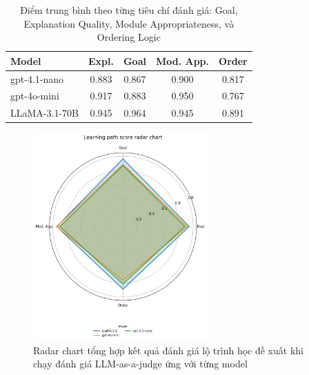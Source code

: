 \begin{table}[h!]
\centering
\begin{tabular}{lcccc}
\toprule
\textbf{Model} & \textbf{Expl.} & \textbf{Goal} & \textbf{Mod. App.} & \textbf{Order} \\
\midrule
gpt-4.1-nano & 0.883 & 0.867 & 0.900 & 0.817 \\
gpt-4o-mini  & 0.917 & 0.883 & 0.950 & 0.767 \\
LLaMA-3.1-70B & 0.945 & 0.964 & 0.945 & 0.891 \\
\bottomrule
\end{tabular}
\caption{Điểm trung bình theo từng tiêu chí đánh giá: Goal, Explanation Quality, Module Appropriateness, và Ordering Logic}
\label{tab:avg_scores_abbr}
\end{table}

\begin{figure}[H]
\centering
    \includegraphics[width=0.6\textwidth]{images/lp_eval_radar_chart.png}
    \caption{Radar chart tổng hợp kết quả đánh giá lộ trình học đề xuất khi chạy đánh giá LLM-as-a-judge ứng với từng model}
\end{figure}

